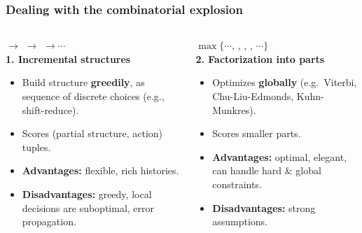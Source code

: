 \begin{frame}[t,label=structuretypes]%
\frametitle{Dealing with the combinatorial explosion}
\begin{columns}[t]%
\begin{column}{.5\textwidth}%
\centering%
 $\rightarrow$
 $\rightarrow$
 $\rightarrow \cdots$
\\[\baselineskip]
\textbf{1. Incremental structures} \\
\begin{itemize}
\item Build structure \textbf{greedily}, as sequence of discrete choices
(e.g., shift-reduce).
\item Scores (partial structure, action) tuples.
\item {\bf Advantages:} flexible, rich histories.
\item {\bf Disadvantages:} greedy, local decisions are suboptimal,
error propagation.
\end{itemize}
\end{column}
\begin{column}{.5\textwidth}%
\centering%
$\max\big\{\cdots$,
,
,
,
$\cdots\big\}$
\\[\baselineskip]

\textbf{2. Factorization into parts} \\
\begin{itemize}
\item Optimizes \textbf{globally} (e.g.\ Viterbi, Chu-Liu-Edmonds,
Kuhn-Munkres).
\item Scores smaller parts.\\
\item {\bf Advantages:} optimal, elegant, can handle hard \& global constraints.
\item {\bf Disadvantages:} strong assumptions.
\end{itemize}
\end{column}
\end{columns}
\end{frame}


